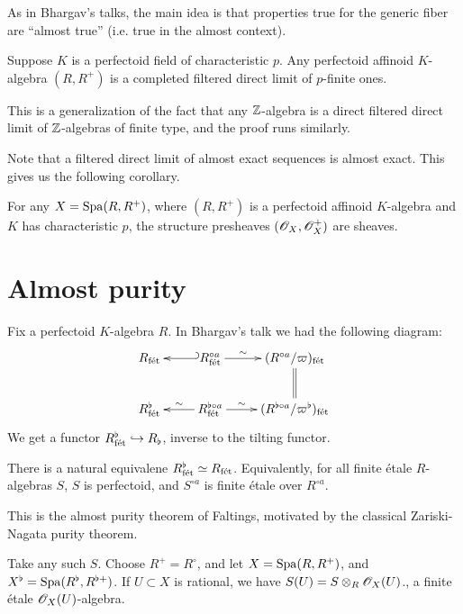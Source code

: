 \documentclass{article}
\begin{document}
As in Bhargav's talks, the main idea is that properties true for the generic fiber 
are ``almost true'' (i.e. true in the almost context). 

\begin{proposition}
Suppose $K$ is a perfectoid field of characteristic $p$. Any perfectoid affinoid 
$K$-algebra $(R,R^+)$ is a completed filtered direct limit of $p$-finite ones. 
\end{proposition}

This is a generalization of the fact that any $\mathbb{Z}$-algebra is a direct filtered 
direct limit of $\mathbb{Z}$-algebras of finite type, and the proof runs similarly. 

Note that a filtered direct limit of almost exact sequences is almost exact. This 
gives us the following corollary. 

\begin{corollary}
For any $X=\operatorname{Spa}(R,R^+)$, where $(R,R^+)$ is a perfectoid affinoid $K$-algebra and 
$K$ has characteristic $p$, the structure presheaves $(\mathscr{O}_X,\mathscr{O}_X^+)$ are 
sheaves. 
\end{corollary}





\section{Almost purity}

Fix a perfectoid $K$-algebra $R$. In Bhargav's talk we had the following diagram:
\[\xymatrix{
  R_\fet 
    & R^{\circ a}_\fet \ar@{_{(}->}[l] \ar[r]^-\sim 
    &  (R^{\circ a}/\varpi)_\fet \ar@{=}[d] \\
  R^\flat_\fet 
    & \ar[l]_-\sim R_\fet^{\flat\circ a} \ar[r]^-\sim 
    & (R^{\flat\circ a}/\varpi^\flat)_\fet
}\]
We get a functor $R_{\textnormal{f\'et}}^\flat \hookrightarrow R_\flat$, inverse to the tilting 
functor. 

\begin{theorem}
There is a natural equivalene $R_{\textnormal{f\'et}}^\flat\simeq R_{\textnormal{f\'et}}$. Equivalently, for all 
finite \'etale $R$-algebras $S$, $S$ is perfectoid, and $S^{\circ a}$ is 
finite \'etale over $R^{\circ a}$. 
\end{theorem}

This is the almost purity theorem of Faltings, motivated by the classical 
Zariski-Nagata purity theorem. 

Take any such $S$. Choose $R^+=R^\circ$, and let $X=\operatorname{Spa}(R,R^+)$, and 
$X^\flat = \operatorname{Spa}(R^\flat,R^{\flat +})$. If $U\subset X$ is rational, we have 
$S(U) = S\otimes_R \mathscr{O}_X(U)$., a finite \'etale $\mathscr{O}_X(U)$-algebra. 
\end{document}
